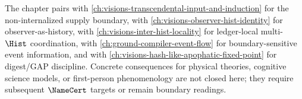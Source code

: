 The chapter pairs with \autoref{ch:visions-transcendental-input-and-induction} for the non-internalized supply boundary, with \autoref{ch:visions-observer-hist-identity} for observer-as-history, with \autoref{ch:visions-inter-hist-locality} for ledger-local multi-$\Hist$ coordination, with \autoref{ch:ground-compiler-event-flow} for boundary-sensitive event information, and with \autoref{ch:visions-hash-like-apophatic-fixed-point} for digest/GAP discipline. Concrete consequences for physical theories, cognitive science models, or first-person phenomenology are not closed here; they require subsequent $\NameCert$ targets or remain boundary readings.

